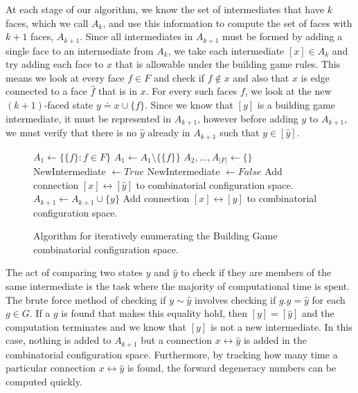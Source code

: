 At each stage of our algorithm, we know the set of intermediates that have $k$ faces, which we call $A_k$, and use this information to compute the set of faces with $k+1$ faces, $A_{k+1}$. Since all intermediates in $A_{k+1}$ must be formed by adding a single face to an intermediate from $A_k$, we take each intermediate $[x] \in A_k$ and try adding each face to $x$ that is allowable under the building game rules. This means we look at every face $f \in F$ and check if $f \not\in x$ and also that $x$ is edge connected to a face $\hat{f}$ that is in $x$. For every such faces $f$, we look at the new $(k+1)$-faced state $y \doteq x\cup \{f\}$. Since we know that $[y]$ is a building game intermediate, it must be represented in $A_{k+1}$, however before adding $y$ to $A_{k+1}$, we must verify that there is no $\hat{y}$ already in $A_{k+1}$ such that $y \in [\hat{y}]$.

\begin{figure}[ht]
\centering
\begin{algorithmic}
  \State $A_1\gets \{\{f\} : f \in F\}$ 
  \State $A_1 \gets A_1 \setminus \{\{f\}\}$
  \EndIf
  \EndFor
  \State $A_2, \dots, A_{|F|} \gets \{\}$ 
  \State NewIntermediate $\gets True$
  \State NewIntermediate $\gets False$
  \State Add connection $[x] \leftrightarrow [\hat{y}]$ to combinatorial configuration space.
  \EndIf
  \EndFor
  \State $A_{k+1} \gets A_{k+1} \cup \{y\}$
  \State Add connection $[x] \leftrightarrow [y]$ to combinatorial configuration space.
  \EndIf
  \EndFor
  \EndFor
  \EndFor
\end{algorithmic}
\caption{Algorithm for iteratively enumerating the Building Game combinatorial configuration space.}
\label{alg:CCS}
\end{figure}

The act of comparing two states $y$ and $\hat{y}$ to check if they are members of the same intermediate is the task where the majority of computational time is spent. The brute force method of checking if $y \sim \hat{y}$ involves checking if $g.y = \hat{y}$ for each $g \in G$. If a $g$ is found that makes this equality hold, then $[y] = [ \hat{y}]$ and the computation terminates and we know that $[y]$ is not a new intermediate. In this case, nothing is added to $A_{k+1}$ but a connection $x \leftrightarrow \hat{y}$ is added in the combinatorial configuration space. Furthermore, by tracking how many time a particular connection $x \leftrightarrow \hat{y}$ is found, the forward degeneracy numbers can be computed quickly. 

